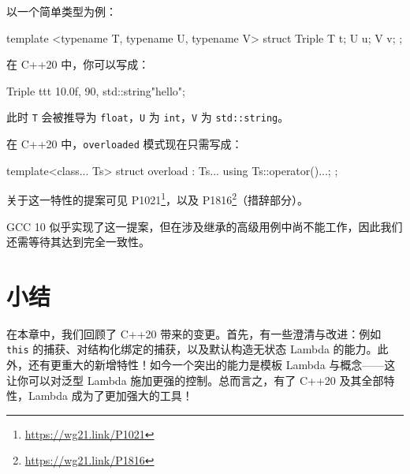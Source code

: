 以一个简单类型为例：

\begin{codebox}
template <typename T, typename U, typename V>
struct Triple { T t; U u; V v; };
\end{codebox}

在 C++20 中，你可以写成：

\begin{codebox}
Triple ttt{ 10.0f, 90, std::string{"hello"}};
\end{codebox}

此时 \texttt{T} 会被推导为 \texttt{float}，\texttt{U} 为 \texttt{int}，\texttt{V} 为 \texttt{std::string}。

在 C++20 中，\texttt{overloaded} 模式现在只需写成：

\begin{codebox}
template<class... Ts> struct overload : Ts... { using Ts::operator()...; };
\end{codebox}

关于这一特性的提案可见 P1021\footnote{\url{https://wg21.link/P1021}}，以及 P1816\footnote{\url{https://wg21.link/P1816}}（措辞部分）。


GCC 10 似乎实现了这一提案，但在涉及继承的高级用例中尚不能工作，因此我们还需等待其达到完全一致性。

\section{小结}

在本章中，我们回顾了 C++20 带来的变更。首先，有一些澄清与改进：例如 \texttt{this} 的捕获、对结构化绑定的捕获，以及默认构造无状态 Lambda 的能力。此外，还有更重大的新增特性！如今一个突出的能力是模板 Lambda 与概念——这让你可以对泛型 Lambda 施加更强的控制。总而言之，有了 C++20 及其全部特性，Lambda 成为了更加强大的工具！
